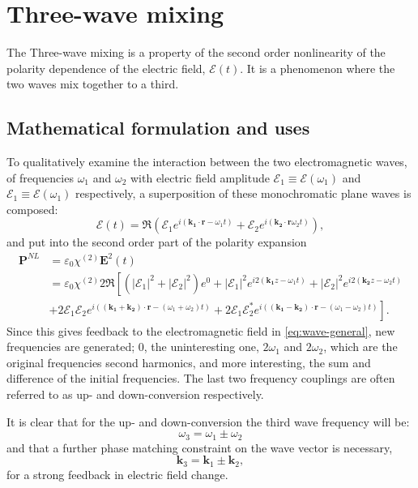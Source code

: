 \chapter{Three-wave mixing}
\label{cha:mixing}


The Three-wave mixing is a property of the second order nonlinearity of the polarity dependence of the electric field, $\mathcal{E}(t)$. 
It is a phenomenon where the two waves mix together to a third. 



\section{Mathematical formulation and uses}
\label{sec:mixing-math}

To qualitatively examine the interaction between the two electromagnetic waves, of frequencies $\omega_1$ and $\omega_2$ with electric field amplitude $\mathcal{E}_1  \equiv \mathcal{E}(\omega_1)$ and $\mathcal{E}_1  \equiv \mathcal{E}(\omega_1)$ respectively, a superposition of these monochromatic plane waves is composed: 
\[
\mathbf{\mathcal{E}}(t) = \Re (\mathcal{E}_1e^{i(\mathbf{k_1} \cdot \mathbf{r} - \omega_1 t)}+\mathcal{E}_2e^{i(\mathbf{k_2} \cdot \mathbf{r} \omega_2 t)}),
\]
and put into the second order part of the polarity expansion \cite[sec.~21.2C]{saleh}
\begin{align}
     \mathbf{P}^{NL} & = \varepsilon_0 \chi^{(2)} \mathbf{E}^2(t) \nonumber \\
&= \varepsilon_0 \chi^{(2)} 2 \Re \left[
\left(|\mathcal{E}_1|^2+|\mathcal{E}_2|^2\right)e^{0} + |\mathcal{E}_1|^2e^{i2(\mathbf{k_1} z - \omega_1t)}+|\mathcal{E}_2|^2e^{i2(\mathbf{k_2} z - \omega_2t)} \right.\nonumber \\
& \left.
+ 2\mathcal{E}_1 \mathcal{E}_2e^{i((\mathbf{k_1} + \mathbf{k_2}) \cdot \mathbf{r} - (\omega_1+\omega_2)t)} 
+ 2\mathcal{E}_1 \mathcal{E}_2^*e^{i((\mathbf{k_1} - \mathbf{k_2}) \cdot \mathbf{r} - (\omega_1-\omega_2)t)} 
\right] \label{eq:MixPNL}.
\end{align}
Since this gives feedback to the electromagnetic field in \cref{eq:wave-general}, new frequencies are generated; $0$, the uninteresting one, $2\omega_1$ and $2\omega_2$, which are the original frequencies second harmonics, and more interesting, the sum and difference of the initial frequencies. The last two frequency couplings are often referred to as up- and down-conversion respectively.

It is clear that for the up- and down-conversion the third wave frequency will be:
\begin{equation}
  \label{qe:freqCond}
\omega_3 = \omega_1 \pm \omega_2
\end{equation}
and that a further phase matching constraint on the wave vector is necessary,
\[
\mathbf{k}_3 = \mathbf{k}_1 \pm \mathbf{k}_2,
\]
for a strong feedback in electric field change.

